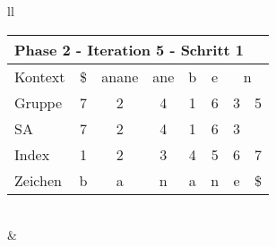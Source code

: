 \begin{table}[H]
\begin{adjustbox}{max width=\textwidth}
\begin{tabular}{ll}
\begin{tabular}{lccccccc}
\multicolumn{8}{l}{Phase 2 - Iteration 5 - Schritt 1}                                                                                                                                                                        \\ \hline
\multicolumn{1}{l|}{Kontext} & \multicolumn{1}{c|}{\$} & \multicolumn{1}{c|}{anane} & \multicolumn{1}{c|}{ane} & \multicolumn{1}{c|}{b}    & \multicolumn{1}{c|}{\cellcolor[HTML]{\green}e} & \multicolumn{2}{c}{n}         \\
\multicolumn{1}{l|}{Gruppe}  & \multicolumn{1}{c|}{7}  & \multicolumn{1}{c|}{2}     & \multicolumn{1}{c|}{4}   & \multicolumn{1}{c|}{1}    & \multicolumn{1}{c|}{\cellcolor[HTML]{\green}6} & 3                         & 5  \\ 
\multicolumn{1}{l|}{SA}      & \multicolumn{1}{c|}{7}  & \multicolumn{1}{c|}{2}     & \multicolumn{1}{c|}{4}   & \multicolumn{1}{c|}{1}    & \multicolumn{1}{c|}{\cellcolor[HTML]{\green}6} & 3                         &    \\ \hline
\multicolumn{1}{l|}{Index}   & 1                       & \cellcolor[HTML]{\red}2  & 3                        & \cellcolor[HTML]{\red}4 & \cellcolor[HTML]{\blue}5                      & \cellcolor[HTML]{\green}6 & 7  \\
\multicolumn{1}{l|}{Zeichen} & b                       & \cellcolor[HTML]{\red}a  & n                        & \cellcolor[HTML]{\red}a & \cellcolor[HTML]{\blue}n                      & \cellcolor[HTML]{\green}e & \$
\end{tabular}

\\
&
\\


\end{tabular}
\end{adjustbox}
\end{table}
